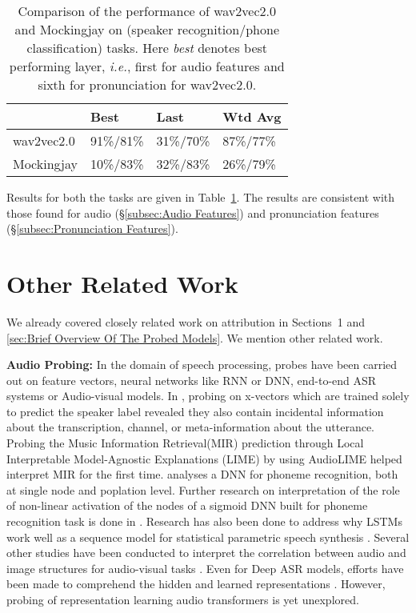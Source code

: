 \documentclass[sigconf]{acmart}
\newcommand{\wv}{wav2vec2.0\xspace}
\newcommand{\mj}{Mockingjay\xspace}
\begin{document}
\begin{table}[!htbp]
\small
\centering

\begin{tabular}{|l|l|l|l|}
\hline
 & \textbf{Best} & \textbf{Last} & \textbf{Wtd Avg}  \\\hline
{\wv} & 91\%/81\% & 31\%/70\% & 87\%/77\% \\\hline
{\mj} & 10\%/83\% & 32\%/83\% & 26\%/79\% \\\hline
\end{tabular}

\caption{\label{table:perf-downstream-tasks-wv-mj} \small Comparison of the performance of {\wv} and {\mj} on (speaker recognition/phone classification) tasks. Here \textit{best} denotes best performing layer, \textit{i.e.}, first for audio features and sixth for pronunciation for {\wv}.
}

\end{table}
Results for both the tasks are given in Table~\ref{table:perf-downstream-tasks-wv-mj}. The results are consistent with those found for audio (\S\ref{subsec:Audio Features}) and pronunciation features (\S\ref{subsec:Pronunciation Features}).

\section{Other Related Work}
\label{sec:related work}
We already covered closely related work on attribution in Sections~1 and \ref{sec:Brief Overview Of The Probed Models}. We mention other related work.

\textbf{Audio Probing:} In the domain of speech processing, probes have been carried out on feature vectors, neural networks like RNN or DNN, end-to-end ASR systems or Audio-visual models. In \cite{raj2019probing}, probing on x-vectors which are trained solely to predict the speaker label revealed they also contain incidental information about the transcription, channel, or meta-information about the utterance. Probing the Music Information Retrieval(MIR) prediction through Local Interpretable Model-Agnostic Explanations (LIME) by using AudioLIME \cite{haunschmid2020audiolime} helped interpret MIR for the first time. \cite{nagamine2015exploring} analyses a DNN for phoneme recognition, both at single node and poplation level. Further research on interpretation of the role of non-linear activation of the nodes of a sigmoid DNN built for phoneme recognition task is done in \cite{nagamine2016role}. Research has also been done to address why LSTMs work well as a sequence model for  statistical parametric speech synthesis \cite{wu2016investigating}. Several other studies have been conducted to interpret the correlation between audio and image structures for audio-visual tasks  \cite{alishahi2017encoding,drexler2017analysis,harwath2017learning}. Even for Deep ASR models, efforts have been made to comprehend the hidden and learned representations \cite{belinkov2017analyzing,elloumi2018analyzing}. However, probing of representation learning audio transformers is yet unexplored. 
\end{document}

